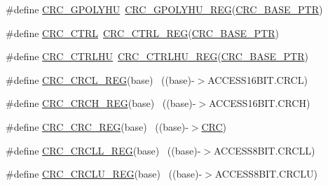 \begin{DoxyCompactItemize}
\item 
\#define \hyperlink{group___c_r_c___register___accessor___macros_ga52c0c04aaa1ae20951eeebeb1c58e96e}{C\+R\+C\+\_\+\+G\+P\+O\+L\+Y\+HU}~\hyperlink{group___c_r_c___register___accessor___macros_ga1692656f77c7ec2de5c561f84e5811b2}{C\+R\+C\+\_\+\+G\+P\+O\+L\+Y\+H\+U\+\_\+\+R\+EG}(\hyperlink{group___c_r_c___peripheral_ga139bd4056b9e3c7987d28b6e955b662d}{C\+R\+C\+\_\+\+B\+A\+S\+E\+\_\+\+P\+TR})
\item 
\#define \hyperlink{group___c_r_c___register___accessor___macros_gae7431cd932210c6ef38ebcd07672aa8b}{C\+R\+C\+\_\+\+C\+T\+RL}~\hyperlink{group___c_r_c___register___accessor___macros_gaf046fbac123e09bad1bf8238974247c5}{C\+R\+C\+\_\+\+C\+T\+R\+L\+\_\+\+R\+EG}(\hyperlink{group___c_r_c___peripheral_ga139bd4056b9e3c7987d28b6e955b662d}{C\+R\+C\+\_\+\+B\+A\+S\+E\+\_\+\+P\+TR})
\item 
\#define \hyperlink{group___c_r_c___register___accessor___macros_gab3a9873d31cfc029f5c1ac6f735a798c}{C\+R\+C\+\_\+\+C\+T\+R\+L\+HU}~\hyperlink{group___c_r_c___register___accessor___macros_ga680ec9b0b037687ce6b43e13d72599a5}{C\+R\+C\+\_\+\+C\+T\+R\+L\+H\+U\+\_\+\+R\+EG}(\hyperlink{group___c_r_c___peripheral_ga139bd4056b9e3c7987d28b6e955b662d}{C\+R\+C\+\_\+\+B\+A\+S\+E\+\_\+\+P\+TR})
\item 
\#define \hyperlink{group___c_r_c___register___accessor___macros_gabad31d8dfe12ca85567b1e6b9027ff66}{C\+R\+C\+\_\+\+C\+R\+C\+L\+\_\+\+R\+EG}(base)                                          ~((base)-\/$>$A\+C\+C\+E\+S\+S16\+B\+I\+T.\+C\+R\+CL)
\item 
\#define \hyperlink{group___c_r_c___register___accessor___macros_ga25a983be1195cec12e80bd5fd70d6bdb}{C\+R\+C\+\_\+\+C\+R\+C\+H\+\_\+\+R\+EG}(base)                                          ~((base)-\/$>$A\+C\+C\+E\+S\+S16\+B\+I\+T.\+C\+R\+CH)
\item 
\#define \hyperlink{group___c_r_c___register___accessor___macros_ga8c19463133fc11b80ce6beaa0559b049}{C\+R\+C\+\_\+\+C\+R\+C\+\_\+\+R\+EG}(base)                                            ~((base)-\/$>$\hyperlink{group___peripheral__declaration_ga4381bb54c2dbc34500521165aa7b89b1}{C\+RC})
\item 
\#define \hyperlink{group___c_r_c___register___accessor___macros_gadd29ee6c1be896d6a29e47087c6fc8c5}{C\+R\+C\+\_\+\+C\+R\+C\+L\+L\+\_\+\+R\+EG}(base)                                        ~((base)-\/$>$A\+C\+C\+E\+S\+S8\+B\+I\+T.\+C\+R\+C\+LL)
\item 
\#define \hyperlink{group___c_r_c___register___accessor___macros_gac563a3cd40ed051f1580525b3d997196}{C\+R\+C\+\_\+\+C\+R\+C\+L\+U\+\_\+\+R\+EG}(base)                                        ~((base)-\/$>$A\+C\+C\+E\+S\+S8\+B\+I\+T.\+C\+R\+C\+LU)

\end{DoxyCompactItemize}

